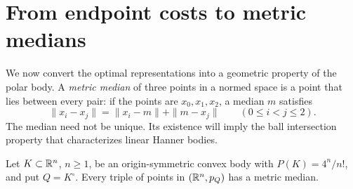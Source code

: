 \section{From endpoint costs to metric medians}\label{sec:median}

We now convert the optimal representations into a geometric property
of the polar body. A \emph{metric median} of three points in a normed
space is a point that lies between every pair: if the points are
$x_0,x_1,x_2$, a median $m$ satisfies
\[
 \|x_i-x_j\|=\|x_i-m\|+\|m-x_j\|
 \qquad(0\le i<j\le2).
\]
The median need not be unique. Its existence will imply the ball
intersection property that characterizes linear Hanner bodies.

\begin{proposition}\label{prop:metric-median}
Let $K\subset\mathbb R^n$, $n\ge1$, be an origin-symmetric convex body with
$P(K)=4^n/n!$, and put $Q=K^\circ$. Every triple of points in
$(\mathbb R^n,p_Q)$ has a metric median.
\end{proposition}

